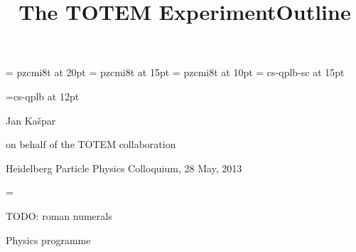 


\iftrue
	\StdBackground
\else
	\SetBackground{fig/bg_prepare.pdf}
	\def\cYe{\cBlack}
	\def\cLRe{\cBlack}
	\def\cRe{\cBlack}
\fi

\font\ExtraTitleFont = pzcmi8t at 20pt
\font\TitleFont = pzcmi8t at 15pt
\font\ContextFont = pzcmi8t at 10pt
\font\PartFont = cs-qplb-sc at 15pt




\def\Em#1{\em{\cLRe#1\cFg}}
\def\EM#1{{\cYe\TitleFont #1\cFg}}


\def\date{28 May, 2013}


\newpage %
\hbox{}\vfil
\title{\ExtraTitleFont The TOTEM Experiment}
\vfil
\font\NameFont=cs-qplb at 12pt
\centerline{\NameFont Jan Kašpar}
\centerline{on behalf of the TOTEM collaboration}
\vfil
{}
\vfil
\centerline{Heidelberg Particle Physics Colloquium, \date}
\vfil

{
\footline={}



\newpage %
\title{Outline}
}

\vfil


TODO: roman numerals

\vfil
\vfil

\newpage %
\hbox{}
\vfil

\vskip2mm
\centerline{\PartFont\cYe Physics programme\cFg}

\vfil


\newpage %
\title{}

